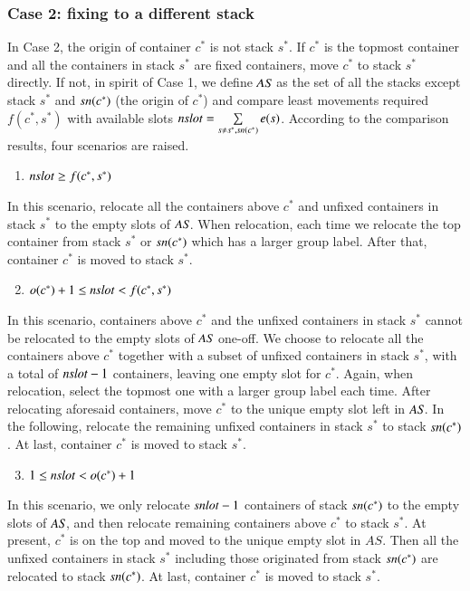 \documentclass[review,3p,times,authoryear,12pt]{elsarticle}
\begin{document}
\subsubsection{Case 2: fixing to a different stack}
In Case 2, the origin of container $c^*$ is not stack $s^*$. If $c^*$ is the topmost container and all the containers in stack $s^*$ are fixed containers, move $c^*$ to stack $s^*$ directly. If not, in spirit of Case 1, we define $\id{AS}$ as the set of all the stacks except stack $s^*$ and $\id{sn}(c^*)$ (the origin of $c^*$) and compare least movements required $f(c^*,s^*)$ with available slots $\id{nslot}=\sum\limits_{s\neq s^*,\id{sn}(c^*)}e(s)$. According to the comparison results, four scenarios are raised.
\begin{enumerate}
\setcounter{enumi}{0}
\item $\id{nslot}\ge f(c^*,s^*)$
\end{enumerate}
In this scenario, relocate all the containers above $c^*$ and unfixed containers in stack $s^*$ to the empty slots of $\id{AS}$. When relocation, each time we relocate the top container from stack $s^*$ or $\id{sn}(c^*)$ which has a larger group label. After that, container $c^*$ is moved to stack $s^*$.

\begin{enumerate}
\setcounter{enumi}{1}
\item $o(c^*)+1\le\id{nslot}< f(c^*,s^*)$
\end{enumerate}
In this scenario, containers above $c^*$ and the unfixed containers in stack $s^*$ cannot be relocated to the empty slots of $\id{AS}$ one-off. We choose to relocate all the containers above $c^*$ together with a subset of unfixed containers in stack $s^*$, with a total of $\id{nslot}-1$ containers, leaving one empty slot for $c^*$. Again, when relocation, select the topmost one with a larger group label each time. After relocating aforesaid containers, move $c^*$ to the unique empty slot left in $\id{AS}$. In the following, relocate the remaining unfixed containers in stack $s^*$ to stack $\id{sn}(c^*)$. At last, container $c^*$ is moved to stack $s^*$.

\begin{enumerate}
\setcounter{enumi}{2}
\item $1\le\id{nslot}< o(c^*)+1$
\end{enumerate}
In this scenario, we only relocate $\id{snlot}-1$ containers of stack $\id{sn}(c^*)$ to the empty slots of $\id{AS}$, and then relocate remaining containers above $c^*$ to stack $s^*$. At present, $c^*$ is on the top and moved to the unique empty slot in $AS$. Then all the unfixed containers in stack $s^*$ including those originated from stack $\id{sn}(c^*)$ are relocated to stack $\id{sn}(c^*)$. At last, container $c^*$ is moved to stack $s^*$.
\end{document}
